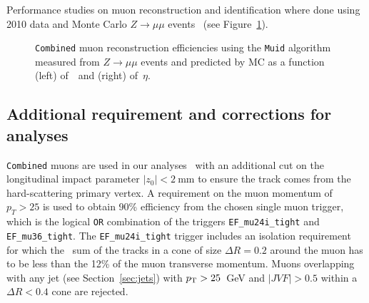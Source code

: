 Performance studies on muon reconstruction and identification where done using 2010 data and Monte
Carlo $Z\to \mu\mu$ events~\cite{ATLAS-CONF-2011-063} (see Figure~\ref{fig:mueff}). 


\begin{figure}[tb]\begin{center}
	\caption{\texttt{Combined} muon reconstruction efficiencies using the \texttt{Muid} algorithm measured from $Z\to \mu\mu$ events and predicted by MC as a function (left) of~\pt\ and (right) of~$\eta$.~\cite{ATLAS-CONF-2011-063}\label{fig:mueff}}
\end{center}\end{figure}


\tocless\subsection{Additional requirement and corrections for analyses}

\texttt{Combined} muons are used in our analyses~\cite{topcommon2013} with an additional cut on the longitudinal impact
parameter $|z_0|<2~$mm to ensure the track comes  from the hard-scattering primary vertex.
A requirement on the muon momentum of $p_T>25$ is used to obtain 90\% efficiency from the chosen 
single muon trigger, which is the logical \texttt{OR} combination of the 
triggers \texttt{EF\_mu24i\_tight} and \texttt{EF\_mu36\_tight}. 
The \texttt{EF\_mu24i\_tight} trigger includes an isolation requirement 
for which the \pt\ sum of the tracks in a cone of size $\Delta R=0.2$  around the muon
has to be less than the 12\% of the muon transverse momentum.
Muons overlapping with any jet (see Section~\ref{sec:jets}) with $\pt>25$~GeV and $|JVF|>0.5$ 
within a $\Delta R<0.4$ cone are rejected.

